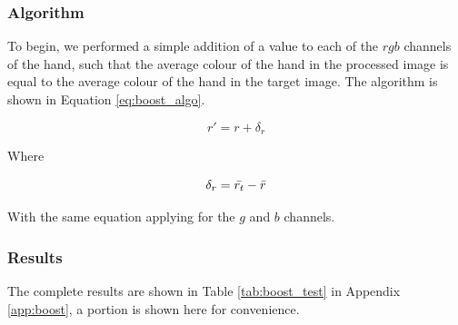 \subsubsection*{Algorithm}
To begin, we performed a simple addition of a value to each of the $rgb$ channels of the hand, such that the average colour of the hand in the processed image is equal to the average colour of the hand in the target image. The algorithm is shown in Equation \ref{eq:boost_algo}.

\begin{equation} \label{eq:boost_algo}
r' = r + \delta_r
\end{equation}

Where 

\begin{equation*}
\delta_r = \bar{r_t} - \bar{r}
\end{equation*}


With the same equation applying for the $g$ and $b$ channels.

\subsubsection*{Results}
The complete results are shown in Table \ref{tab:boost_test} in Appendix \ref{app:boost}, a portion is shown here for convenience.

